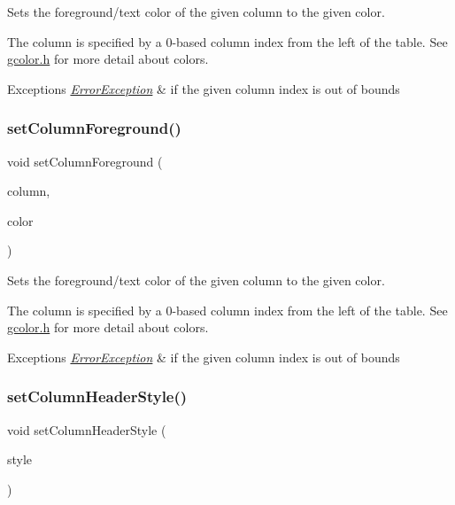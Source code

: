 Sets the foreground/text color of the given column to the given color. 

The column is specified by a 0-\/based column index from the left of the table. See \mbox{\hyperlink{gcolor_8h_source}{gcolor.\+h}} for more detail about colors. 
\begin{DoxyExceptions}{Exceptions}
{\em \mbox{\hyperlink{classErrorException}{Error\+Exception}}} & if the given column index is out of bounds \\
\hline
\end{DoxyExceptions}
\mbox{\label{classGTable_a84ca08c2995646ab28c78bffbcdc2693}} 
\subsubsection{\texorpdfstring{set\+Column\+Foreground()}{setColumnForeground()}\hspace{0.1cm}{\footnotesize\ttfamily [2/2]}}
{\footnotesize\ttfamily void set\+Column\+Foreground (\begin{DoxyParamCaption}\item[{int}]{column,  }\item[{const std\+::string \&}]{color }\end{DoxyParamCaption})\hspace{0.3cm}{\ttfamily [virtual]}}



Sets the foreground/text color of the given column to the given color. 

The column is specified by a 0-\/based column index from the left of the table. See \mbox{\hyperlink{gcolor_8h_source}{gcolor.\+h}} for more detail about colors. 
\begin{DoxyExceptions}{Exceptions}
{\em \mbox{\hyperlink{classErrorException}{Error\+Exception}}} & if the given column index is out of bounds \\
\hline
\end{DoxyExceptions}
\mbox{\label{classGTable_ac97cb91256925fa81c52594bca854969}} 
\subsubsection{\texorpdfstring{set\+Column\+Header\+Style()}{setColumnHeaderStyle()}}
{\footnotesize\ttfamily void set\+Column\+Header\+Style (\begin{DoxyParamCaption}\item[{\mbox{\hyperlink{classGTable_a060cff504451bbb98530e64e936e2671}{G\+Table\+::\+Column\+Header\+Style}}}]{style }\end{DoxyParamCaption})\hspace{0.3cm}{\ttfamily [virtual]}}



